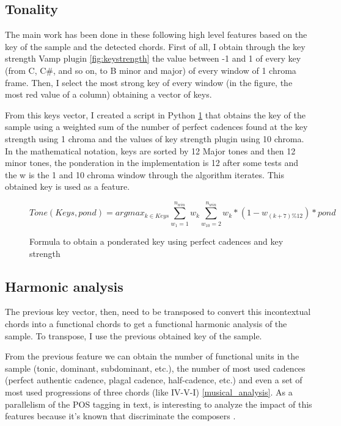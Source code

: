\documentclass[a4paper,openany,oneside,12pt]{book}
\begin{document}
\subsection{Tonality}\label{subsec:chord_windows}
The main work has been done in these following high level features based on the key of the sample and the detected chords. First of all, I obtain through the key strength Vamp plugin  \ref{fig:keystrength} the value between -1 and 1 of every key (from C, C\#, and so on, to B minor and major) of every window of 1 chroma frame. Then, I select the most strong key of every window (in the figure, the most red value of a column) obtaining a vector of keys.

From this keys vector, I created a script in Python \ref{fig:keyFormula} that obtains the key of the sample using a weighted sum of the number of perfect cadences found at the key strength using 1 chroma and the values of key strength plugin using 10 chroma. In the mathematical notation, keys are sorted by 12 Major tones and then 12 minor tones, the ponderation in the implementation is 12 after some tests and the w is the 1 and 10 chroma window through the algorithm iterates. This obtained key is used as a feature.

\begin{figure}

\[ Tone(Keys,pond) = argmax_{k \in Keys} \sum_{w_{1}=1}^{n_{win}} w_k \sum_{w_{10}=2}^{n_{win}} w_k * (1-w_{(k+7)\%12})*pond \]
\caption{Formula to obtain a ponderated key using perfect cadences and key strength} \label{fig:keyFormula}
\end{figure}


\subsection{Harmonic analysis}\label{subsec:uni_bi_tri}
The previous key vector, then, need to be transposed to convert this incontextual chords into a functional chords to get a functional harmonic analysis of the sample. To transpose, I use the previous obtained key of the sample.

From the previous feature we can obtain the number of functional units in the sample (tonic, dominant, subdominant, etc.), the number of most used cadences (perfect authentic cadence, plagal cadence, half-cadence, etc.) and even a set of most used progressions of three chords (like IV-V-I) \ref{musical_analysis}. As a parallelism of the POS tagging in text, is interesting to analyze the impact of this features because it's known that discriminate the composers \cite{desportes}.
\end{document}
